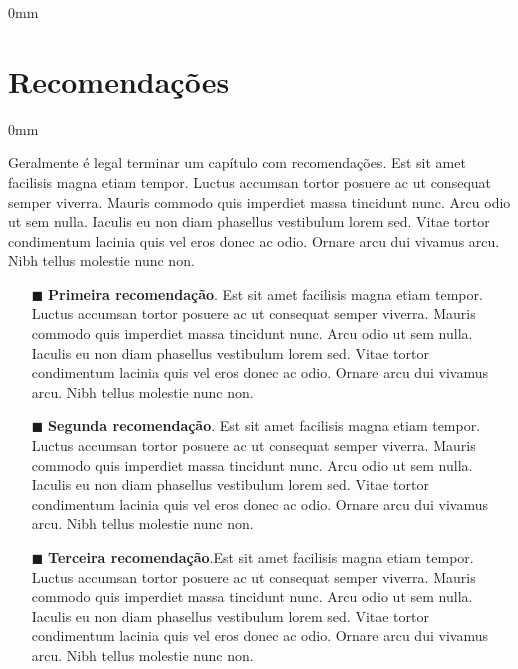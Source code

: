 \documentclass[./main.tex]{subfiles}
\begin{document}
\begin{adjustwidth}{\bodytab}{0mm}
\blindtext[2]

\end{adjustwidth}


\section{Recomendações} \label{chp2:summary}

\begin{adjustwidth}{\bodytab}{0mm}
\par Geralmente é legal terminar um capítulo com recomendações. Est sit amet facilisis magna etiam tempor. Luctus accumsan tortor posuere ac ut consequat semper viverra. Mauris commodo quis imperdiet massa tincidunt nunc. Arcu odio ut sem nulla. Iaculis eu non diam phasellus vestibulum lorem sed. Vitae tortor condimentum lacinia quis vel eros donec ac odio. Ornare arcu dui vivamus arcu. Nibh tellus molestie nunc non.

\begin{itemize}
    \item[$\blacksquare$] \textbf{Primeira recomendação}. Est sit amet facilisis magna etiam tempor. Luctus accumsan tortor posuere ac ut consequat semper viverra. Mauris commodo quis imperdiet massa tincidunt nunc. Arcu odio ut sem nulla. Iaculis eu non diam phasellus vestibulum lorem sed. Vitae tortor condimentum lacinia quis vel eros donec ac odio. Ornare arcu dui vivamus arcu. Nibh tellus molestie nunc non.
    \item  [$\blacksquare$] \textbf{Segunda recomendação}. Est sit amet facilisis magna etiam tempor. Luctus accumsan tortor posuere ac ut consequat semper viverra. Mauris commodo quis imperdiet massa tincidunt nunc. Arcu odio ut sem nulla. Iaculis eu non diam phasellus vestibulum lorem sed. Vitae tortor condimentum lacinia quis vel eros donec ac odio. Ornare arcu dui vivamus arcu. Nibh tellus molestie nunc non.
    \item[$\blacksquare$] \textbf{Terceira recomendação}.Est sit amet facilisis magna etiam tempor. Luctus accumsan tortor posuere ac ut consequat semper viverra. Mauris commodo quis imperdiet massa tincidunt nunc. Arcu odio ut sem nulla. Iaculis eu non diam phasellus vestibulum lorem sed. Vitae tortor condimentum lacinia quis vel eros donec ac odio. Ornare arcu dui vivamus arcu. Nibh tellus molestie nunc non. 
\end{itemize}

\end{adjustwidth}
\end{document}
